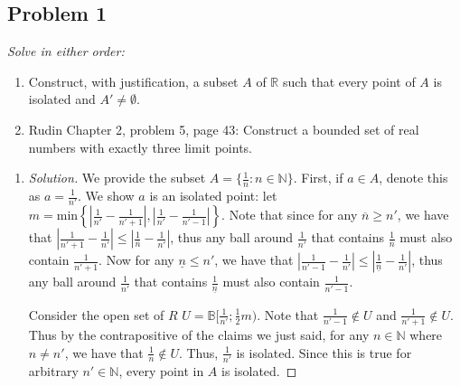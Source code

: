 \documentclass{article}
\newcommand{\N}{{\mathbb N}}
\newcommand{\R}{{\mathbb R}}
\begin{document}
\subsection*{Problem 1}
{\it Solve in either order:
\begin{enumerate}
	\item Construct, with justification, a subset $A$ of $\R$ such that
	every point of $A$ is isolated and $A'\neq\emptyset$.
	\item Rudin Chapter 2, problem 5, page 43:
		Construct a bounded set of real numbers with exactly three limit points.
\end{enumerate}}

\begin{enumerate}
	\item \begin{proof}[Solution]\let\qed\relax
		We provide the subset $A = \{\frac{1}{n} \colon n \in \N\}$.
		First, if $a \in A$, denote this as $a = \frac{1}{n'}$.
		We show $a$ is an isolated point:
		let $m = \mathrm{min}\left\{\left|\frac{1}{n'} - \frac{1}{n'+1}\right|,
		\left|\frac{1}{n'} - \frac{1}{n'-1}\right|\right\}$.
		Note that since for any $\overline{n} \geq n'$,
		we have that $\left|\frac{1}{n'+1} - \frac{1}{n'}\right| \leq
		\left|\frac{1}{\overline{n}} - \frac{1}{n'}\right|$,
		thus any ball around $\frac{1}{n'}$ that contains $\frac{1}{\overline{n}}$
		must also contain $\frac{1}{n'+1}$.
		Now for any $\underline{n} \leq n'$,
		we have that $\left|\frac{1}{n'-1} - \frac{1}{n'}\right| \leq
		\left|\frac{1}{\underline{n}} - \frac{1}{n'}\right|$,
		thus any ball around $\frac{1}{n'}$ that contains $\frac{1}{\underline{n}}$
		must also contain $\frac{1}{n'-1}$.

		Consider the open set of $R$
		$U = \mathbb{B}[\frac{1}{n'}; \frac12m)$.
		Note that $\frac{1}{n'-1} \not\in U$
		and $\frac{1}{n'+1} \not\in U$.
		Thus by the contrapositive of the claims we just said,
		for any $n \in \N$ where $n \neq n'$,
		we have that $\frac{1}{n} \not\in U$.
		Thus, $\frac{1}{n'}$ is isolated.
		Since this is true for arbitrary $n' \in \N$,
		every point in $A$ is isolated.


\end{proof}
\end{enumerate}
\end{document}
